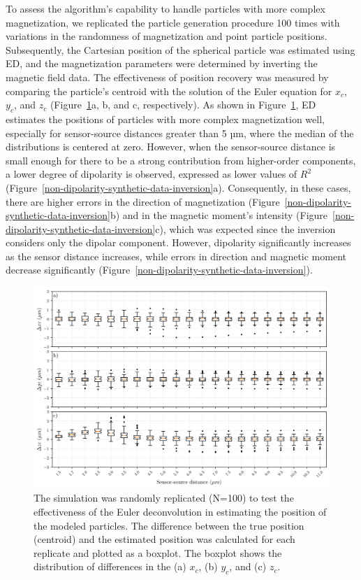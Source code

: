 To assess the algorithm's capability to handle particles with more complex magnetization, we replicated the particle generation procedure 100 times with variations in the randomness of magnetization and point particle positions. Subsequently, the Cartesian position of the spherical particle was estimated using ED, and the magnetization parameters were determined by inverting the magnetic field data. The effectiveness of position recovery was measured by comparing the particle's centroid with the solution of the Euler equation for $x_c$, $y_c$, and $z_c$ (Figure~\ref{non-dipolarity-synthetic-data-positioning}a, b, and c, respectively). As shown in Figure~\ref{non-dipolarity-synthetic-data-positioning}, ED estimates the positions of particles with more complex magnetization well, especially for sensor-source distances greater than 5 µm, where the median of the distributions is centered at zero. However, when the sensor-source distance is small enough for there to be a strong contribution from higher-order components, a lower degree of dipolarity is observed, expressed as lower values of $R^2$ (Figure~\ref{non-dipolarity-synthetic-data-inversion}a). Consequently, in these cases, there are higher errors in the direction of magnetization (Figure~\ref{non-dipolarity-synthetic-data-inversion}b) and in the magnetic moment's intensity (Figure~\ref{non-dipolarity-synthetic-data-inversion}c), which was expected since the inversion considers only the dipolar component. However, dipolarity significantly increases as the sensor distance increases, while errors in direction and magnetic moment decrease significantly (Figure~\ref{non-dipolarity-synthetic-data-inversion}).

\begin{figure}[tb!]
  \centering
  \includegraphics[width=1\linewidth]{paper/figures/non-dipolarity-synthetic-positioning.png}
  \caption{The simulation was randomly replicated (N=100) to test the effectiveness of the Euler deconvolution in estimating the position of the modeled particles. The difference between the true position (centroid) and the estimated position was calculated for each replicate and plotted as a boxplot. The boxplot shows the distribution of differences in the (a) $x_c$, (b) $y_c$, and (c) $z_c$.}
  \label{non-dipolarity-synthetic-data-positioning}
\end{figure}

